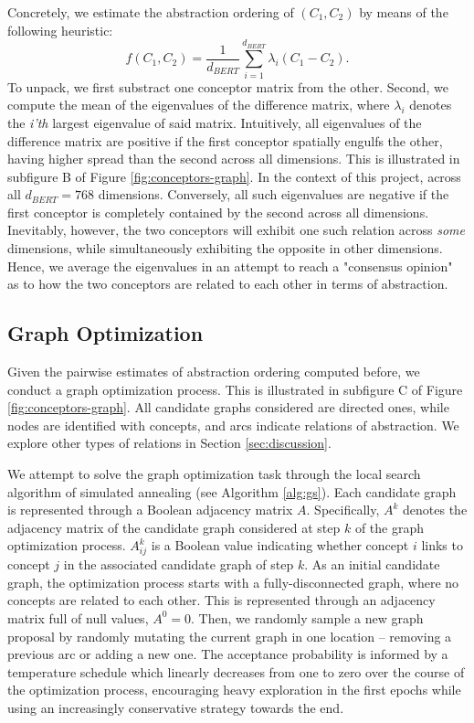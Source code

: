 Concretely, we estimate the abstraction ordering of $(C_1, C_2)$ by means of the following heuristic:$$f(C_1, C_2) = \frac{1}{d_{BERT}} \sum\limits_{i=1}^{d_{BERT}} \lambda_i(C_1 - C_2).$$ To unpack, we first substract one conceptor matrix from the other. Second, we compute the mean of the eigenvalues of the difference matrix, where $\lambda_i$ denotes the \textit{i'th} largest eigenvalue of said matrix. Intuitively, all eigenvalues of the difference matrix are positive if the first conceptor spatially engulfs the other, having higher spread than the second across all dimensions. This is illustrated in subfigure B of Figure \ref{fig:conceptors-graph}. In the context of this project, across all $d_{BERT} = 768$ dimensions. Conversely, all such eigenvalues are negative if the first conceptor is completely contained by the second across all dimensions. Inevitably, however, the two conceptors will exhibit one such relation across \textit{some} dimensions, while simultaneously exhibiting the opposite in other dimensions. Hence, we average the eigenvalues in an attempt to reach a "consensus opinion" as to how the two conceptors are related to each other in terms of abstraction.

\subsection{Graph Optimization}

Given the pairwise estimates of abstraction ordering computed before, we conduct a graph optimization process. This is illustrated in subfigure C of Figure \ref{fig:conceptors-graph}. All candidate graphs considered are directed ones, while nodes are identified with concepts, and arcs indicate relations of abstraction. We explore other types of relations in Section \ref{sec:discussion}.

We attempt to solve the graph optimization task through the local search algorithm of simulated annealing (see Algorithm \ref{alg:gs}). Each candidate graph is represented through a Boolean adjacency matrix $A$. Specifically, $A^k$ denotes the adjacency matrix of the candidate graph considered at step $k$ of the graph optimization process. $A^k_{ij}$ is a Boolean value indicating whether concept $i$ links to concept $j$ in the associated candidate graph of step $k$. As an initial candidate graph, the optimization process starts with a fully-disconnected graph, where no concepts are related to each other. This is represented through an adjacency matrix full of null values, $A^0 = 0$. Then, we randomly sample a new graph proposal by randomly mutating the current graph in one location -- removing a previous arc or adding a new one. The acceptance probability is informed by a temperature schedule which linearly decreases from one to zero over the course of the optimization process, encouraging heavy exploration in the first epochs while using an increasingly conservative strategy towards the end.

